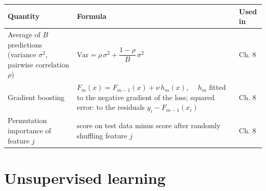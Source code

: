\documentclass[
  letterpaper,
  DIV=11,
  numbers=noendperiod]{scrreprt}
\begin{document}
\begin{longtable}[]{@{}
  >{\raggedright\arraybackslash}p{}
  >{\raggedright\arraybackslash}p{}
  >{\raggedright\arraybackslash}p{}@{}}
\toprule\noalign{}
\begin{minipage}[b]{\linewidth}\raggedright
Quantity
\end{minipage} & \begin{minipage}[b]{\linewidth}\raggedright
Formula
\end{minipage} & \begin{minipage}[b]{\linewidth}\raggedright
Used in
\end{minipage} \\
\midrule\noalign{}
\endhead
\bottomrule\noalign{}
\endlastfoot
Average of \(B\) predictions (variance \(\sigma^2\), pairwise
correlation \(\rho\)) &
\(\text{Var} = \rho\,\sigma^2 + \dfrac{1 - \rho}{B}\,\sigma^2\) & Ch.
8 \\
Gradient boosting & \(F_m(x) = F_{m-1}(x) + \nu\,h_m(x)\), \(\quad h_m\)
fitted to the negative gradient of the loss; squared error: to the
residuals \(y_i - F_{m-1}(x_i)\) & Ch. 8 \\
Permutation importance of feature \(j\) & score on test data minus score
after randomly shuffling feature \(j\) & Ch. 8 \\
\end{longtable}

\section{Unsupervised learning}\label{unsupervised-learning-1}
\end{document}

